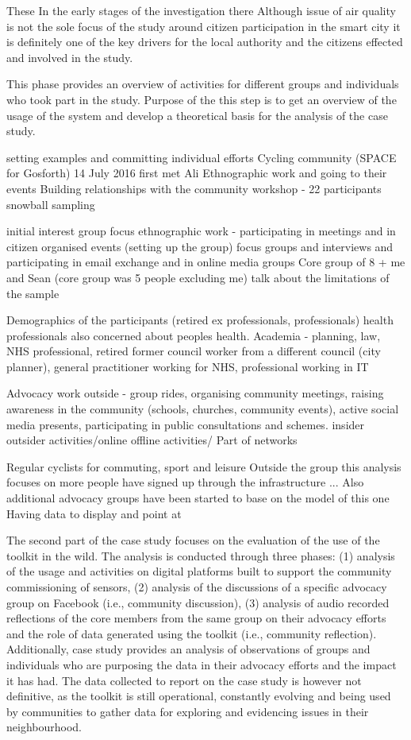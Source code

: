 These In the early stages of the investigation there 
Although issue of air quality is not the sole focus of the study around citizen participation in the smart city it is definitely one of the key drivers for the local authority and the citizens effected and involved in the study.

This phase provides an overview of activities for different groups and individuals who took part in the study. Purpose of the this step is to get an overview of the usage of the system and develop a theoretical basis for the analysis of the case study.

setting examples and committing individual efforts
Cycling community (SPACE for Gosforth) 14 July 2016 first met Ali
Ethnographic work and going to their events
Building relationships with the community
workshop - 22 participants
snowball sampling

initial interest group focus
ethnographic work - participating in meetings and in citizen organised events (setting up the group)
focus groups and interviews and participating in email exchange and in online media groups
Core group of 8 + me and Sean (core group was 5 people excluding me)
talk about the limitations of the sample

Demographics of the participants (retired ex professionals, professionals) health professionals also concerned about peoples health. Academia - planning, law, NHS professional, retired former council worker from a different council (city planner), general practitioner working for NHS, professional working in IT

Advocacy work outside - group rides, organising community meetings, raising awareness in the community (schools, churches, community events), active social media presents, participating in public consultations and schemes. 
insider outsider activities/online offline activities/ Part of networks

Regular cyclists for commuting, sport and leisure
Outside the group this analysis focuses on more people have signed up through the infrastructure ...
Also additional advocacy groups have been started to base on the model of this one
Having data to display and point at
 
The second part of the case study focuses on the evaluation of the use of the toolkit in the wild. The analysis is conducted through three phases: (1) analysis of the usage and activities on digital platforms built to support the community commissioning of sensors, (2) analysis of the discussions of a specific advocacy group on Facebook (i.e., community discussion), (3) analysis of audio recorded reflections of the core members from the same group on their advocacy efforts and the role of data generated using the toolkit (i.e., community reflection). Additionally, case study provides an analysis of observations of groups and individuals who are purposing the data in their advocacy efforts and the impact it has had. The data collected to report on the case study is however not definitive, as the toolkit is still operational, constantly evolving and being used by communities to gather data for exploring and evidencing issues in their neighbourhood.

